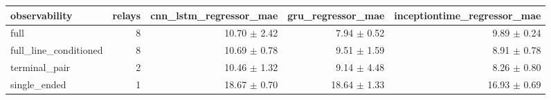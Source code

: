 \begin{tabular}{lrrrr}
\toprule
observability & relays & cnn\_lstm\_regressor\_mae & gru\_regressor\_mae & inceptiontime\_regressor\_mae \\
\midrule
full & 8 & 10.70 $\pm$ 2.42 & 7.94 $\pm$ 0.52 & 9.89 $\pm$ 0.24 \\
full\_line\_conditioned & 8 & 10.69 $\pm$ 0.78 & 9.51 $\pm$ 1.59 & 8.91 $\pm$ 0.78 \\
terminal\_pair & 2 & 10.46 $\pm$ 1.32 & 9.14 $\pm$ 4.48 & 8.26 $\pm$ 0.80 \\
single\_ended & 1 & 18.67 $\pm$ 0.70 & 18.64 $\pm$ 1.33 & 16.93 $\pm$ 0.69 \\
\bottomrule
\end{tabular}

